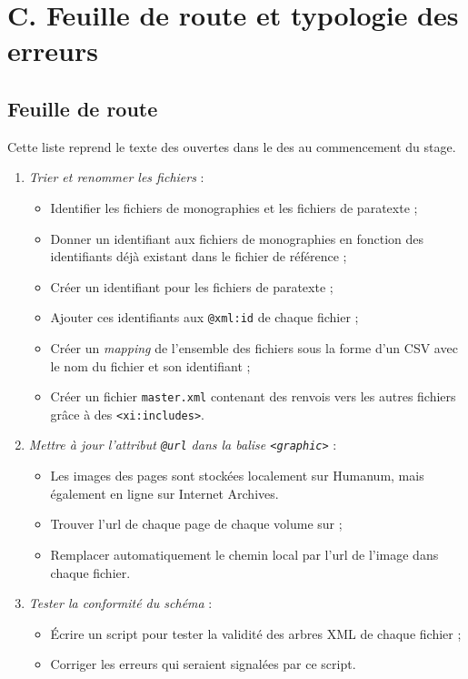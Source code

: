 \renewcommand{\thesection}{C.1}
\chapter{C. Feuille de route et typologie des erreurs}

\section{Feuille de route}
\label{ann:feuille_route}

Cette liste reprend le texte des \issues{} ouvertes dans le \gitlab{} des \odm{} au commencement du stage.

\begin{enumerate}
        \item \textit{Trier et renommer les fichiers} :
    \begin{itemize}
        \item  Identifier les fichiers de monographies et les fichiers de paratexte ;
        \item  Donner un identifiant aux fichiers de monographies en fonction des identifiants déjà existant dans le fichier de référence ;
        \item  Créer un identifiant pour les fichiers de paratexte ;
        \item  Ajouter ces identifiants aux \texttt{@xml:id} de chaque fichier ;
        \item  Créer un \textit{mapping} de l’ensemble des fichiers sous la forme d’un CSV avec le nom du fichier et son identifiant ;
        \item  Créer un fichier \texttt{master.xml} contenant des renvois vers les autres fichiers grâce à des \texttt{<xi:includes>}.
    \end{itemize}

    \item \textit{Mettre à jour l’attribut \texttt{@url} dans la balise \texttt{<graphic>}} :
    \begin{itemize}
        \item  Les images des pages sont stockées localement sur Humanum, mais également en ligne sur Internet Archives.
        \item  Trouver l’url de chaque page de chaque volume sur \ia ;
        \item  Remplacer automatiquement le chemin local par l’url de l’image dans chaque fichier.
    \end{itemize}

    \item \textit{Tester la conformité du schéma} :
    \begin{itemize}
        \item  Écrire un script pour tester la validité des arbres XML de chaque fichier ;
        \item  Corriger les erreurs qui seraient signalées par ce script.
    \end{itemize}


\end{enumerate}
